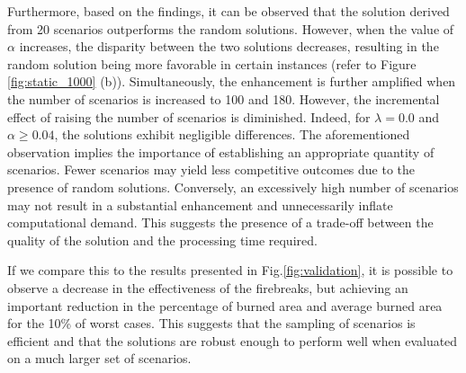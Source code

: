 \documentclass[a4paper,fleqn]{cas-sc}
\begin{document}
Furthermore, based on the findings, it can be observed that the solution derived from 20 scenarios outperforms the random solutions. However, when the value of $\alpha$ increases, the disparity between the two solutions decreases, resulting in the random solution being more favorable in certain instances (refer to Figure \ref{fig:static_1000} (b)). Simultaneously, the enhancement is further amplified when the number of scenarios is increased to 100 and 180. However, the incremental effect of raising the number of scenarios is diminished. Indeed, for $\lambda = 0.0$ and $\alpha \geq 0.04$, the solutions exhibit negligible differences. The aforementioned observation implies the importance of establishing an appropriate quantity of scenarios. Fewer scenarios may yield less competitive outcomes due to the presence of random solutions. Conversely, an excessively high number of scenarios may not result in a substantial enhancement and unnecessarily inflate computational demand. This suggests the presence of a trade-off between the quality of the solution and the processing time required.

If we compare this to the results presented in Fig.\:\ref{fig:validation}, it is possible to observe a decrease in the effectiveness of the firebreaks, but achieving an important reduction in the percentage of burned area and average burned area for the 10\% of worst cases. This suggests that the sampling of scenarios is efficient and that the solutions are robust enough to perform well when evaluated on a much larger set of scenarios.
\end{document}
